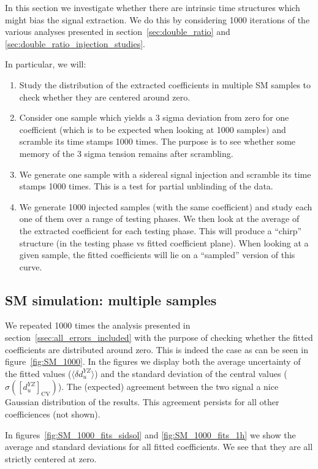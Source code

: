 In this section we investigate whether there are intrinsic time structures which might bias the signal extraction. We do this by considering 1000 iterations of the various analyses presented in section~\ref{sec:double_ratio} and \ref{sec:double_ratio_injection_studies}.

In particular, we will:
\begin{enumerate}
    \item Study the distribution of the extracted coefficients in multiple SM samples to check whether they are centered around zero.
    \item Consider one sample which yields a 3 sigma deviation from zero for one coefficient (which is to be expected when looking at 1000 samples) and scramble its time stamps 1000 times. The purpose is to see whether some memory of the 3 sigma tension remains after scrambling.
    \item We generate one sample with a sidereal signal injection and scramble its time stamps 1000 times. This is a test for partial unblinding of the data.
    \item We generate 1000 injected samples (with the same coefficient) and study each one of them over a range of testing phases. We then look at the average of the extracted coefficient for each testing phase. This will produce a ``chirp'' structure (in the testing phase vs fitted coefficient plane). When looking at a given sample, the fitted coefficients will lie on a ``sampled'' version of this curve. 
\end{enumerate}

\subsection{SM simulation: multiple samples}
\label{ssec:SM_1000}
%
We repeated 1000 times the analysis presented in section~\ref{ssec:all_errors_included} with the purpose of checking whether the fitted coefficients are distributed around zero. This is indeed the case as can be seen in figure~\ref{fig:SM_1000}. In the figures we display both the average uncertainty of the fitted values ($\langle \delta d_u^{YZ} \rangle$) and the standard deviation of the central values ($\sigma ([d_u^{YZ}]_\text{CV})$). The (expected) agreement between the two signal a nice Gaussian distribution of the results. This agreement persists for all other coefficiences (not shown).

In figures~\ref{fig:SM_1000_fits_sidsol} and \ref{fig:SM_1000_fits_1h} we show the average and standard deviations for all fitted coefficients. We see that they are all strictly centered at zero.

